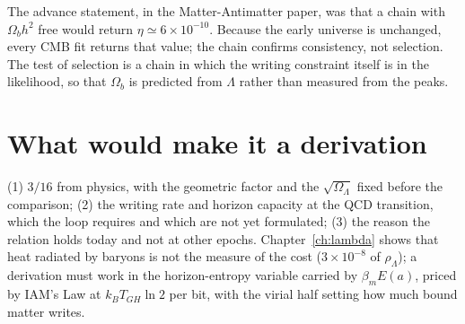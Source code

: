 The advance statement, in the Matter-Antimatter paper, was that a chain with $\Omega_bh^2$ free would return $\eta\simeq6\times10^{-10}$. Because the early universe is unchanged,
every CMB fit returns that value; the chain confirms consistency, not selection. The test of selection is a chain in which the writing constraint itself is in the
likelihood, so that $\Omega_b$ is predicted from $\Lambda$ rather than measured from the peaks.

\section{What would make it a derivation}
(1) $3/16$ from physics, with the geometric factor and the $\sqrt{\Omega_\Lambda}$ fixed before the comparison; (2) the writing rate and
horizon capacity at the QCD transition, which the loop requires and which are not yet formulated; (3) the reason the relation holds today and
not at other epochs. Chapter~\ref{ch:lambda} shows that heat radiated by baryons is not the measure of the cost ($3\times10^{-8}$ of $\rho_\Lambda$); a
derivation must work in the horizon-entropy variable carried by $\beta_mE(a)$, priced by IAM's Law at $k_BT_{GH}\ln2$ per bit, with the virial half setting how much bound matter writes.
